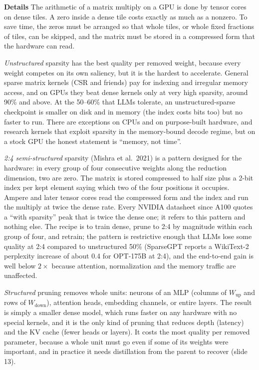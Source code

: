 \documentclass[11pt,letterpaper]{article}
\newcommand{\para}[1]{\medskip\noindent\textbf{#1}\quad}
\begin{document}
\para{Details} The arithmetic of a matrix multiply on a GPU is done by tensor cores on dense tiles. A zero inside a dense tile costs exactly as much as a nonzero. To save time, the zeros must be arranged so that whole tiles, or whole fixed fractions of tiles, can be skipped, and the matrix must be stored in a compressed form that the hardware can read.

\emph{Unstructured} sparsity has the best quality per removed weight, because every weight competes on its own saliency, but it is the hardest to accelerate. General sparse matrix kernels (CSR and friends) pay for indexing and irregular memory access, and on GPUs they beat dense kernels only at very high sparsity, around 90\% and above. At the 50--60\% that LLMs tolerate, an unstructured-sparse checkpoint is smaller on disk and in memory (the index costs bits too) but no faster to run. There are exceptions on CPUs and on purpose-built hardware, and research kernels that exploit sparsity in the memory-bound decode regime, but on a stock GPU the honest statement is ``memory, not time''.

\emph{2:4 semi-structured} sparsity (Mishra et al.\ 2021) is a pattern designed for the hardware: in every group of four consecutive weights along the reduction dimension, two are zero. The matrix is stored compressed to half size plus a 2-bit index per kept element saying which two of the four positions it occupies. Ampere and later tensor cores read the compressed form and the index and run the multiply at twice the dense rate. Every NVIDIA datasheet since A100 quotes a ``with sparsity'' peak that is twice the dense one; it refers to this pattern and nothing else. The recipe is to train dense, prune to 2:4 by magnitude within each group of four, and retrain; the pattern is restrictive enough that LLMs lose some quality at 2:4 compared to unstructured 50\% (SparseGPT reports a WikiText-2 perplexity increase of about 0.4 for OPT-175B at 2:4), and the end-to-end gain is well below $2\times$ because attention, normalization and the memory traffic are unaffected.

\emph{Structured} pruning removes whole units: neurons of an MLP (columns of $W_{\text{up}}$ and rows of $W_{\text{down}}$), attention heads, embedding channels, or entire layers. The result is simply a smaller dense model, which runs faster on any hardware with no special kernels, and it is the only kind of pruning that reduces depth (latency) and the KV cache (fewer heads or layers). It costs the most quality per removed parameter, because a whole unit must go even if some of its weights were important, and in practice it needs distillation from the parent to recover (slide 13).
\end{document}
